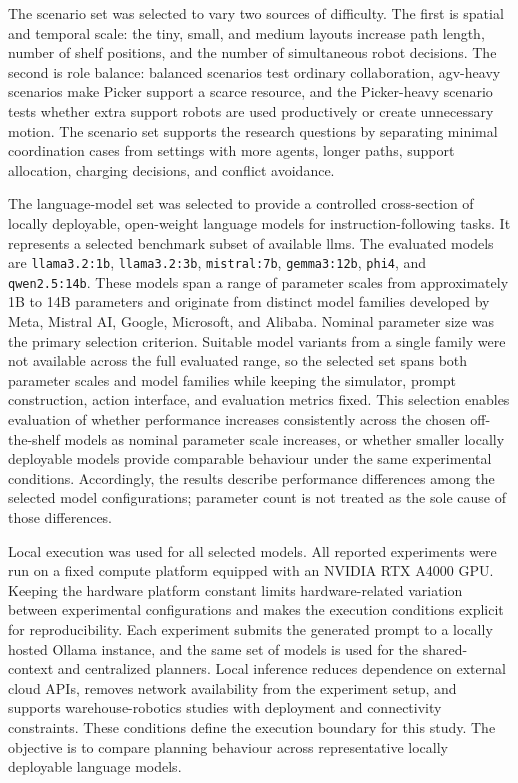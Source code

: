 The scenario set was selected to vary two sources of difficulty.
The first is spatial and temporal scale: the tiny, small, and medium layouts increase path length, number of shelf positions, and the number of simultaneous robot decisions.
The second is role balance: balanced scenarios test ordinary collaboration, \gls{agv}-heavy scenarios make Picker support a scarce resource, and the Picker-heavy scenario tests whether extra support robots are used productively or create unnecessary motion.
The scenario set supports the research questions by separating minimal coordination cases from settings with more agents, longer paths, support allocation, charging decisions, and conflict avoidance.

The language-model set was selected to provide a controlled cross-section of locally deployable, open-weight language models for instruction-following tasks.
It represents a selected benchmark subset of available \glspl{llm}.
The evaluated models are \nolinkurl{llama3.2:1b}, \nolinkurl{llama3.2:3b}, \nolinkurl{mistral:7b}, \nolinkurl{gemma3:12b}, \nolinkurl{phi4}, and \nolinkurl{qwen2.5:14b}.
These models span a range of parameter scales from approximately 1B to 14B parameters and originate from distinct model families developed by Meta, Mistral AI, Google, Microsoft, and Alibaba.
Nominal parameter size was the primary selection criterion. Suitable model variants from a single family were not available across the full evaluated range, so the selected set spans both parameter scales and model families while keeping the simulator, prompt construction, action interface, and evaluation metrics fixed.
This selection enables evaluation of whether performance increases consistently across the chosen off-the-shelf models as nominal parameter scale increases, or whether smaller locally deployable models provide comparable behaviour under the same experimental conditions.
Accordingly, the results describe performance differences among the selected model configurations; parameter count is not treated as the sole cause of those differences.

Local execution was used for all selected models. All reported experiments were run on a fixed compute platform equipped with an NVIDIA RTX A4000 GPU. Keeping the hardware platform constant limits hardware-related variation between experimental configurations and makes the execution conditions explicit for reproducibility.
Each experiment submits the generated prompt to a locally hosted Ollama instance, and the same set of models is used for the shared-context and centralized planners.
Local inference reduces dependence on external cloud APIs, removes network availability from the experiment setup, and supports warehouse-robotics studies with deployment and connectivity constraints.
These conditions define the execution boundary for this study.
The objective is to compare planning behaviour across representative locally deployable language models.

